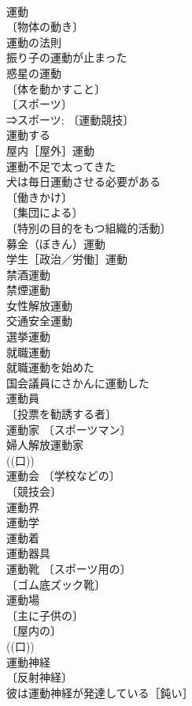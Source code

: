 \documentclass[8pt]{extreport}
\begin{document}
\begin{CJK}{UTF8}{min}
\\	運動	
\\	〔物体の動き〕
\\	運動の法則 
\\	振り子の運動が止まった 
\\	惑星の運動 
\\	〔体を動かすこと〕
\\	〔スポーツ〕
\\	⇒スポーツ; 〔運動競技〕
\\	運動する 
\\	屋内［屋外］運動 
\\	運動不足で太ってきた 
\\	犬は毎日運動させる必要がある 
\\	〔働きかけ〕
\\	〔集団による〕
\\	〔特別の目的をもつ組織的活動〕
\\	募金（ぼきん）運動 
\\	学生［政治／労働］運動 
\\	禁酒運動 
\\	禁煙運動 
\\	女性解放運動 
\\	交通安全運動 
\\	選挙運動 
\\	就職運動 
\\	就職運動を始めた 
\\	国会議員にさかんに運動した 
\\	運動員 
\\	〔投票を勧誘する者〕
\\	運動家 〔スポーツマン〕
\\	婦人解放運動家 
\\	((口)) 
\\	運動会 〔学校などの〕
\\	〔競技会〕
\\	運動界 
\\	運動学 
\\	運動着 
\\	運動器具 
\\	運動靴 〔スポーツ用の〕
\\	〔ゴム底ズック靴〕
\\	運動場 
\\	〔主に子供の〕
\\	〔屋内の〕
\\	((口)) 
\\	運動神経 
\\	〔反射神経〕
\\	彼は運動神経が発達している［鈍い］ 

\end{CJK}
\end{document}
